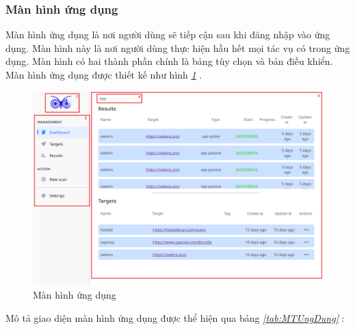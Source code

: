 \newpage
\subsubsection{Màn hình ứng dụng}

\tab Màn hình ứng dụng là nơi người dùng sẽ tiếp cận sau khi đăng nhập vào ứng dụng.
Màn hình này là nơi người dùng thực hiện hầu hết mọi tác vụ có trong ứng dụng.
Màn hình có hai thành phần chính là bảng tùy chọn và bản điều khiển.
Màn hình ứng dụng được thiết kế như hình \textit{\ref{fig:MHUngDung} }.

\begin{figure}[H]
      \centering
      \includegraphics[width=\textwidth]{applied-thesis-chapters/chapter-3/Màn hình ứng dụng.png}
      \caption{Màn hình ứng dụng}
      \label{fig:MHUngDung}
\end{figure}

Mô tả giao diện màn hình ứng dụng được thể hiện qua bảng \textit{\ref{tab:MTUngDung} }:

